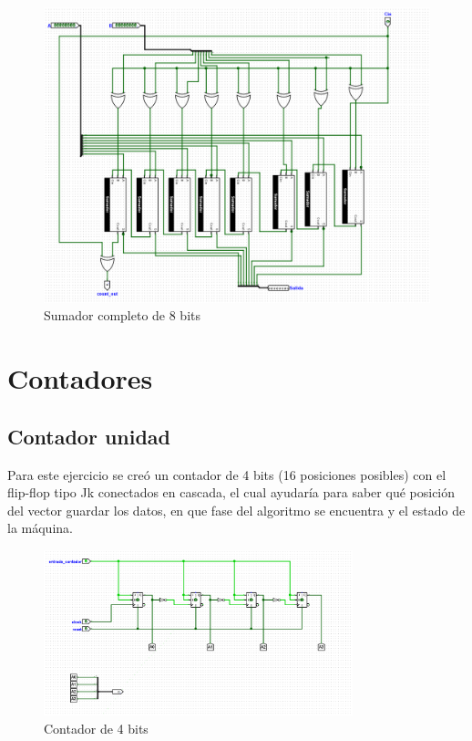 \documentclass{article}
\begin{document}
\begin{figure}[h]
\begin{minipage}{0.45\textwidth}
      \includegraphics[width=\linewidth]{imagenes/sumador8.png} %
      \caption{Sumador completo de 8 bits}
      \label{fig:sumador8}
    \end{minipage}
\end{figure}

\section{Contadores}
\subsection{Contador unidad}
Para este ejercicio se creó un contador de 4 bits (16 posiciones posibles) con el flip-flop tipo Jk 
conectados en cascada, el cual ayudaría para saber qué posición del vector guardar los datos, en que 
fase del algoritmo se encuentra y el estado de la máquina.
\begin{figure}[h] %
    \centering
    \includegraphics[width=0.8\textwidth]{imagenes/contador.png} %
    \caption{Contador de 4 bits} %
    \label{fig:contador} %
\end{figure}
\end{document}
